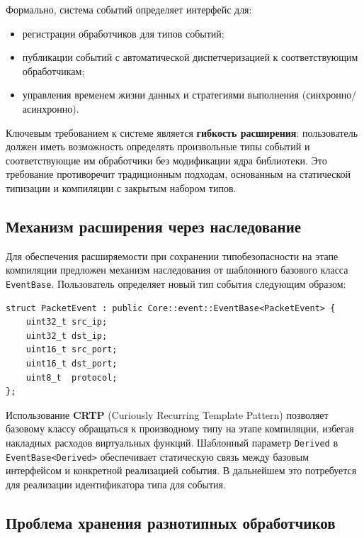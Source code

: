 Формально, система событий определяет интерфейс для:
\begin{itemize}
    \item регистрации обработчиков для типов событий;
    \item публикации событий с автоматической диспетчеризацией к соответствующим обработчикам;
    \item управления временем жизни данных и стратегиями выполнения (синхронно/асинхронно).
\end{itemize}

Ключевым требованием к системе является \textbf{гибкость расширения}: пользователь должен иметь возможность определять произвольные типы событий и соответствующие им обработчики без модификации ядра библиотеки.
Это требование противоречит традиционным подходам, основанным на статической типизации и компиляции с закрытым набором типов.

\subsection{Механизм расширения через наследование}

Для обеспечения расширяемости при сохранении типобезопасности на этапе компиляции предложен механизм наследования от шаблонного базового класса \texttt{EventBase}. Пользователь определяет новый тип события следующим образом:

\begin{lstlisting}[caption={Определение пользовательского события через наследование от EventBase},label=lst:user_event]
struct PacketEvent : public Core::event::EventBase<PacketEvent> {
    uint32_t src_ip;
    uint32_t dst_ip;
    uint16_t src_port;
    uint16_t dst_port;
    uint8_t  protocol;
};
\end{lstlisting}

Использование \textbf{CRTP} (Curiously Recurring Template Pattern) \cite{vandevoorde2017cpp} позволяет базовому классу обращаться к производному типу на этапе компиляции, избегая накладных расходов виртуальных функций.
Шаблонный параметр \texttt{Derived} в \texttt{EventBase<Derived>} обеспечивает статическую связь между базовым интерфейсом и конкретной реализацией события.
В дальнейшем это потребуется для реализации идентификатора типа для события.

\subsection{Проблема хранения разнотипных обработчиков}

